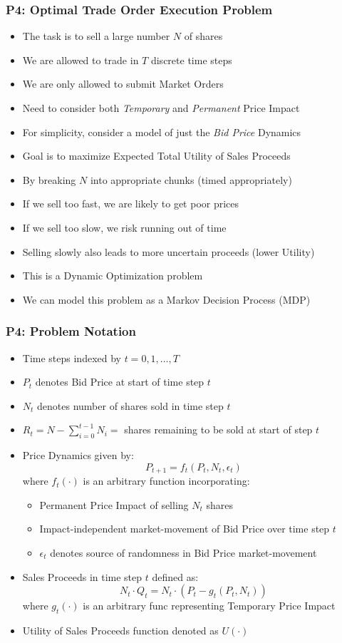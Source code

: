 \documentclass[handout]{beamer}
\begin{document}
\begin{frame}
\frametitle{P4: Optimal Trade Order Execution Problem}
\pause
\begin{itemize}[<+->]
\item The task is to sell a large number $N$ of shares
\item We are allowed to trade in $T$ discrete time steps
\item We are only allowed to submit Market Orders
\item Need to consider both {\em Temporary} and {\em Permanent} Price Impact
\item For simplicity, consider a model of just the {\em Bid Price} Dynamics
\item Goal is to maximize Expected Total Utility of Sales Proceeds
\item By breaking $N$ into appropriate chunks (timed appropriately)
\item If we sell too fast, we are likely to get poor prices
\item If we sell too slow, we risk running out of time
\item Selling slowly also leads to more uncertain proceeds (lower Utility)
\item This is a Dynamic Optimization problem
\item We can model this problem as a Markov Decision Process (MDP)
\end{itemize}
\end{frame}

\begin{frame}
\frametitle{P4: Problem Notation}
\pause
\begin{itemize}[<+->]
\item Time steps indexed by $t = 0, 1, \ldots, T$
\item $P_t$ denotes Bid Price at start of time step $t$
\item $N_t$ denotes number of shares sold in time step $t$
\item $R_t = N - \sum_{i=0}^{t-1}N_i = $ shares remaining to be sold at start of step $t$
\item Price Dynamics given by:
$$P_{t+1} = f_t(P_t, N_t, \epsilon_t)$$
where $f_t(\cdot)$ is an arbitrary function incorporating:
\begin{itemize}
\item Permanent Price Impact of selling $N_t$ shares
\item Impact-independent market-movement of Bid Price over time step $t$
\item $\epsilon_t$ denotes source of randomness in Bid Price market-movement
\end{itemize}
\item Sales Proceeds in time step $t$ defined as:
$$N_t \cdot Q_t = N_t \cdot (P_t - g_t(P_t, N_t))$$
where $g_t(\cdot)$ is an arbitrary func representing Temporary Price Impact
\item Utility of Sales Proceeds function denoted as $U(\cdot)$
\end{itemize}
\end{frame}
\end{document}
